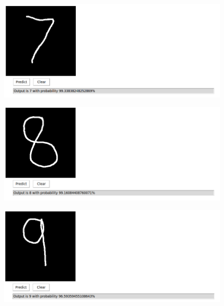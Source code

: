 \documentclass[letterpaper]{article}
\begin{document}
\begin{large}
    \begin{figure}[!ht]
        \centering
        \includegraphics[scale = 0.5]{../figs/7.png}
    \end{figure}

    \begin{figure}[!ht]
        \centering
        \includegraphics[scale = 0.5]{../figs/8.png}
    \end{figure}

    \begin{figure}[!ht]
        \centering
        \includegraphics[scale = 0.5]{../figs/9.png}
    \end{figure}

\end{large}
\end{document}

